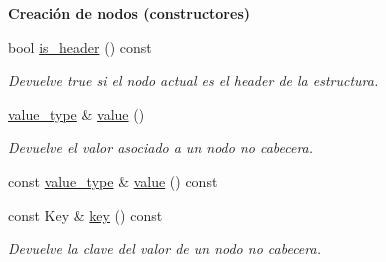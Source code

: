 \begin{Indent}{\bf \-Creación de nodos (constructores)}
\begin{Indent}
\begin{DoxyCompactItemize}
\item 
bool \hyperlink{structaed2_1_1map_1_1Node_ab684678442a3c5f53eb00ed48a9270a9_ab684678442a3c5f53eb00ed48a9270a9}{is\+\_\+header} () const
\begin{DoxyCompactList}\small\item\em Devuelve true si el nodo actual es el header de la estructura. \end{DoxyCompactList}\item 
\hyperlink{classaed2_1_1map_a719db98e0ff9a837610f76be33264680_a719db98e0ff9a837610f76be33264680}{value\+\_\+type} \& \hyperlink{structaed2_1_1map_1_1Node_af4ada8e79dabb4849fc87de63d3970fb_af4ada8e79dabb4849fc87de63d3970fb}{value} ()
\begin{DoxyCompactList}\small\item\em Devuelve el valor asociado a un nodo no cabecera. \end{DoxyCompactList}\item 
const \hyperlink{classaed2_1_1map_a719db98e0ff9a837610f76be33264680_a719db98e0ff9a837610f76be33264680}{value\+\_\+type} \& \hyperlink{structaed2_1_1map_1_1Node_ab66a33cedd0ba5cc20e366d4769184ae_ab66a33cedd0ba5cc20e366d4769184ae}{value} () const
\item 
const Key \& \hyperlink{structaed2_1_1map_1_1Node_a08fd071b9bba8048526b8da7e8d73831_a08fd071b9bba8048526b8da7e8d73831}{key} () const
\begin{DoxyCompactList}\small\item\em Devuelve la clave del valor de un nodo no cabecera. \end{DoxyCompactList}\end{DoxyCompactItemize}
\end{Indent}

\end{Indent}
